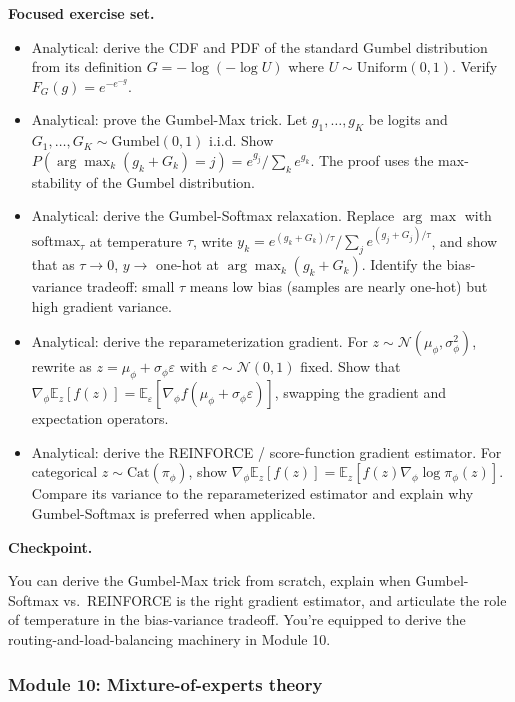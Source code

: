 \textbf{Focused exercise set.}

\begin{itemize}
\tightlist
\item
  Analytical: derive the CDF and PDF of the standard Gumbel distribution
  from its definition \(G = -\log(-\log U)\) where
  \(U \sim \text{Uniform}(0, 1)\). Verify \(F_G(g) = e^{-e^{-g}}\).
\item
  Analytical: prove the Gumbel-Max trick. Let \(g_1, \ldots, g_K\) be
  logits and \(G_1, \ldots, G_K \sim \text{Gumbel}(0, 1)\) i.i.d. Show
  \(P(\arg\max_k (g_k + G_k) = j) = e^{g_j} / \sum_k e^{g_k}\). The
  proof uses the max-stability of the Gumbel distribution.
\item
  Analytical: derive the Gumbel-Softmax relaxation. Replace \(\arg\max\)
  with \(\text{softmax}_\tau\) at temperature \(\tau\), write
  \(y_k = e^{(g_k + G_k)/\tau} / \sum_j e^{(g_j + G_j)/\tau}\), and show
  that as \(\tau \to 0\), \(y \to\) one-hot at
  \(\arg\max_k(g_k + G_k)\). Identify the bias-variance tradeoff: small
  \(\tau\) means low bias (samples are nearly one-hot) but high gradient
  variance.
\item
  Analytical: derive the reparameterization gradient. For
  \(z \sim \mathcal{N}(\mu_\phi, \sigma_\phi^2)\), rewrite as
  \(z = \mu_\phi + \sigma_\phi \varepsilon\) with
  \(\varepsilon \sim \mathcal{N}(0, 1)\) fixed. Show that
  \(\nabla_\phi \mathbb{E}_z[f(z)] = \mathbb{E}_\varepsilon[\nabla_\phi f(\mu_\phi + \sigma_\phi \varepsilon)]\),
  swapping the gradient and expectation operators.
\item
  Analytical: derive the REINFORCE / score-function gradient estimator.
  For categorical \(z \sim \text{Cat}(\pi_\phi)\), show
  \(\nabla_\phi \mathbb{E}_z[f(z)] = \mathbb{E}_z[f(z) \nabla_\phi \log \pi_\phi(z)]\).
  Compare its variance to the reparameterized estimator and explain why
  Gumbel-Softmax is preferred when applicable.
\end{itemize}

\textbf{Checkpoint.}

You can derive the Gumbel-Max trick from scratch, explain when
Gumbel-Softmax vs.~REINFORCE is the right gradient estimator, and
articulate the role of temperature in the bias-variance tradeoff. You're
equipped to derive the routing-and-load-balancing machinery in Module
10.

\subsubsection{Module 10: Mixture-of-experts
theory}\label{module-10-mixture-of-experts-theory}

